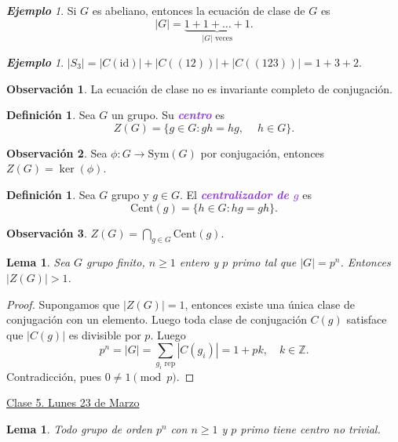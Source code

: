 \documentclass{article}
\newtheorem{lemma}[theorem]{Lema}
\theoremstyle{definition}
\newtheorem{definition}[theorem]{Definición}
\newtheorem*{obs}{Observación}
\theoremstyle{remark}
\newtheorem{example}[theorem]{\textbf{Ejemplo}}
\numberwithin{equation}{section}
\newcommand{\Z}{\mathbb{Z}}
\newcommand{\id}{\mathrm{id}}
\newcommand{\Sym}{\mathrm{Sym}}
\newcommand{\Cent}{\mathrm{Cent}}
\newcommand{\abs}[1]{\left| #1 \right|}
\newcommand{\ds}{\displaystyle}
\newcommand{\wea}[1]{\textcolor{BlueViolet}{\textbf{\emph{#1}}}}
\newcommand{\fecha}[1]{\begin{flushright} \underline{#1} \end{flushright}}
\begin{document}
\begin{example}
  Si $G$ es abeliano, entonces la ecuación de clase de $G$ es $$\abs G = \underbrace{1+1+\dots+1}_{\abs G \text{ veces}}.$$
\end{example}

\begin{example}
  $|S_3| = |C(\id)| + |C((12))| + |C((123))| = 1+3+2$.
\end{example}

\begin{obs}
  La ecuación de clase no es invariante completo de conjugación.
\end{obs}

\begin{definition}
  Sea $G$ un grupo. Su \wea{centro} es
  \[Z(G) = \{g \in G \colon gh=hg, \quad \ h \in G\}.\]
\end{definition}

\begin{obs}
  Sea $\phi \colon G \to \Sym(G)$ por conjugación, entonces $Z(G) = \ker(\phi)$. %
\end{obs}

\begin{definition}
  Sea $G$ grupo y $g \in G$. El \wea{centralizador de $g$} es
  \[\Cent(g) = \{h \in G \colon hg = gh\}.\]
\end{definition}

\begin{obs}
  $\ds Z(G) = \bigcap_{g \in G} \Cent(g)$.
\end{obs}

\newpage %
\begin{lemma}
  Sea $G$ grupo finito, $n\geq 1$ entero y $p$ primo tal que $\abs G = p^n$. Entonces $\abs{Z(G)} > 1$.
\end{lemma}
\begin{proof}
  Supongamos que $\abs{Z(G)}=1$, entonces existe una única clase de conjugación con un elemento. Luego toda clase de conjugación $C(g)$ satisface que $\abs{C(g)}$ es divisible por $p$. Luego
  \[p^n = \abs{G} = \sum_{g_i \text{ rep}} \abs{C(g_i)} = 1 +pk, \quad k \in \Z.\]
  Contradicción, pues $0 \neq 1 \pmod p$.
\end{proof}

\fecha{Clase 5. Lunes 23 de Marzo}

\begin{lemma}
  Todo grupo de orden $p^n$ con $n \geq 1$ y $p$ primo tiene centro no trivial.
\end{lemma}
\end{document}
